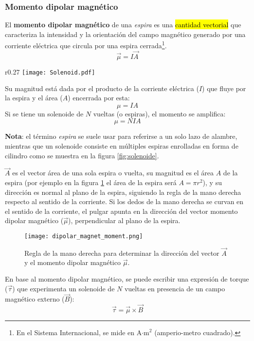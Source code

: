 \subsubsection{Momento dipolar magnético}

El \textbf{momento dipolar magnético} de una \textit{espira} es una \hl{cantidad vectorial} que caracteriza la intensidad y la orientación del campo magnético generado por una corriente eléctrica que circula por una espira cerrada\footnote{En el Sistema Internacional, se mide en \(\text{A·m}^2\) (amperio-metro cuadrado).}.
\[
  \vec{\mu} = I \vec{A}
\]

\begin{wrapfigure}{r}{0.27\textwidth}
  \centering
  \texttt{[image: Solenoid.pdf]}
  \caption{Imágen de un solenoide}
  \label{fig:solenoide}
\end{wrapfigure}
Su magnitud está dada por el producto de la corriente eléctrica (\(I\)) que fluye por la espira y el área (\(A\)) encerrada por esta:  
\[
  \mu = I A
\]  
Si se tiene un solenoide de \(N\) vueltas (o espiras), el momento se amplifica:  
\[
  \mu = N I A
\]

\begin{tcolorbox}
  \textbf{Nota}: el término \textit{espira} se suele usar para referirse a un solo lazo de alambre, mientras que un solenoide consiste en múltiples espiras enrolladas en forma de cilindro como se muestra en la figura \ref{fig:solenoide}.
\end{tcolorbox}

\(\vec{A}\) es el vector área de una sola espira o vuelta, su magnitud es el área \(A\) de la espira (por ejemplo en la figura \ref{fig:dipolar_magnet_moment} el área de la espira será \(A=\pi r^2\)), y su dirección es normal al plano de la espira, siguiendo la regla de la mano derecha respecto al sentido de la corriente. Si los dedos de la mano derecha se curvan en el sentido de la corriente, el pulgar apunta en la dirección del vector momento dipolar magnético (\(\vec{\mu}\)), perpendicular al plano de la espira.
\begin{figure}[ht]
  \centering
  \texttt{[image: dipolar\_magnet\_moment.png]}
  \caption{Regla de la mano derecha para determinar la dirección del vector \(\vec{A}\) y el momento dipolar magnético \(\vec{\mu}\).}
  \label{fig:dipolar_magnet_moment}
\end{figure}

En base al momento dipolar magnético, se puede escribir una expresión de torque (\(\vec{\tau}\)) que experimenta un solenoide de \(N\) vueltas en presencia de un campo magnético externo (\(\vec{B}\)): 
\[
  \vec{\tau} = \vec{\mu} \times \vec{B}
\]

